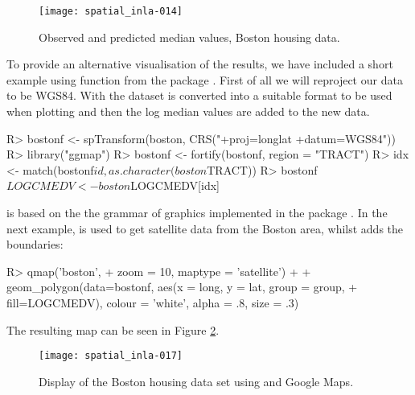 \documentclass[article]{jss}
\begin{document}
\begin{figure}[h!]
\begin{center}
\texttt{[image: spatial\_inla-014]}
\end{center}
\caption{Observed and predicted median values, Boston housing data.}
\label{fig:spplot}
\end{figure}

To provide an alternative visualisation of the results, we have included a
short example using function  from the  package
\citep{KahleWickham:2013}.  First of all we will reproject our data to be
WGS84. With  the  dataset is converted into a
suitable format to be used when plotting and then the log median values are
added to the new data.



\begin{Schunk}
\begin{Sinput}
R> bostonf <- spTransform(boston, CRS("+proj=longlat +datum=WGS84"))
R> library("ggmap")
R> bostonf <- fortify(bostonf, region = "TRACT")
R> idx <- match(bostonf$id, as.character(boston$TRACT))
R> bostonf$LOGCMEDV <- boston$LOGCMEDV[idx]
\end{Sinput}
\end{Schunk}
\noindent
{} is based on the the grammar of graphics implemented in the
 package \citep{Wickham:2009}. In the next example,
 is used to get satellite data from the Boston area,
whilst  adds the boundaries:

\begin{Schunk}
\begin{Sinput}
R> qmap('boston',
+     zoom = 10, maptype = 'satellite') +
+  geom_polygon(data=bostonf, aes(x = long, y = lat, group = group, 
+     fill=LOGCMEDV), colour = 'white', alpha = .8, size = .3)
\end{Sinput}
\end{Schunk}
\noindent
The resulting map can be seen in Figure \ref{fig:ggmap}.


\begin{figure}[h!]
\begin{center}
\texttt{[image: spatial\_inla-017]}
\caption{Display of the Boston housing data set using 
and Google Maps.} 
\label{fig:ggmap}
\end{center}
\end{figure}
\end{document}
